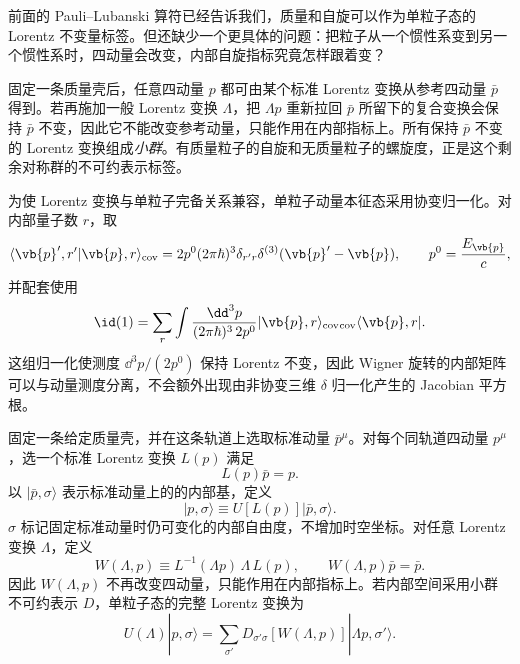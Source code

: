 前面的 Pauli--Lubanski 算符已经告诉我们，质量和自旋可以作为单粒子态的 Lorentz 不变量标签。但还缺少一个更具体的问题：把粒子从一个惯性系变到另一个惯性系时，四动量会改变，内部自旋指标究竟怎样跟着变？

固定一条质量壳后，任意四动量 $p$ 都可由某个标准 Lorentz 变换从参考四动量 $\bar p$ 得到。若再施加一般 Lorentz 变换 $\Lambda$，把 $\Lambda p$ 重新拉回 $\bar p$ 所留下的复合变换会保持 $\bar p$ 不变，因此它不能改变参考动量，只能作用在内部指标上。所有保持 $\bar p$ 不变的 Lorentz 变换组成\emph{小群}。有质量粒子的自旋和无质量粒子的螺旋度，正是这个剩余对称群的不可约表示标签。

为使 Lorentz 变换与单粒子完备关系兼容，单粒子动量本征态采用协变归一化。对内部量子数 $r$，取
\begin{equation}
 {
 \langle \vb{p}',r'|\vb{p},r\rangle_{\rm cov}
 =2p^0(2\pi\hbar)^3\delta_{r'r}
 \delta^{(3)}(\vb{p}'-\vb{p}),
 \qquad p^0=\frac{E_{\vb{p}}}{c},}
 \label{eq:rel-state-normalization-si-r9}
\end{equation}
并配套使用
\begin{equation}
 {
 \id(1)=\sum_r\int
 \frac{\dd^3 p}{(2\pi\hbar)^3\,2p^0}
 |\vb{p},r\rangle_{\rm cov}
 {}_{\rm cov}\langle\vb{p},r|.}
 \label{eq:rel-completeness-si-r9}
\end{equation}
这组归一化使测度 $\dd^3 p/(2p^0)$ 保持 Lorentz 不变，因此 Wigner 旋转的内部矩阵可以与动量测度分离，不会额外出现由非协变三维 $\delta$ 归一化产生的 Jacobian 平方根。

固定一条给定质量壳，并在这条轨道上选取标准动量 $\bar p^\mu$。对每个同轨道四动量 $p^\mu$，选一个标准 Lorentz 变换 $L(p)$ 满足
\begin{equation}
 L(p)\bar p=p.
 \label{eq:wigner-standard-boost-dp9}
\end{equation}
以 $|\bar p,\sigma\rangle$ 表示标准动量上的的内部基，定义
\begin{equation}
 |p,\sigma\rangle
 \equiv U[L(p)]|\bar p,\sigma\rangle.
 \label{eq:wigner-state-definition-dp9}
\end{equation}
$\sigma$ 标记固定标准动量时仍可变化的内部自由度，不增加时空坐标。对任意 Lorentz 变换 $\Lambda$，定义
\begin{equation}
 {
 W(\Lambda,p)
 \equiv L^{-1}(\Lambda p)\,\Lambda\,L(p),
 \qquad
 W(\Lambda,p)\bar p=\bar p.}
 \label{eq:wigner-little-group-element-dp68}
\end{equation}
因此 $W(\Lambda,p)$ 不再改变四动量，只能作用在内部指标上。若内部空间采用小群不可约表示 $D$，单粒子态的完整 Lorentz 变换为
\begin{equation}
 {
 U(\Lambda)|p,\sigma\rangle
 =\sum_{\sigma'}
 D_{\sigma'\sigma}[W(\Lambda,p)]
 |\Lambda p,\sigma'\rangle.}
 \label{eq:wigner-state-transform-dp68}
\end{equation}

